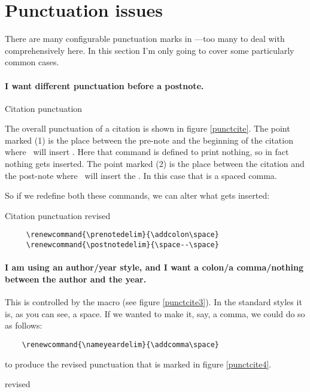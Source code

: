 \section{Punctuation issues}\label{sec:punctuation}

There are many configurable punctuation marks in \biblatex---too many to deal with comprehensively here. In this section I'm only going to cover some particularly common cases.

\paragraph{I want different punctuation before a postnote.}
\begin{marginfigure}[12ex]
\vspace{3pt}%
\caption{Citation punctuation}\label{punctcite}
\end{marginfigure}
 The overall punctuation of a citation is shown in figure \ref{punctcite}. The point marked (1) is the place between the pre-note and the beginning of the citation where \biblatex\ will insert . Here that command is defined to print nothing, so in fact nothing gets inserted. The point marked (2) is the place between the citation and the post-note where \biblatex\ will insert the . In this case that is a spaced comma.

 So if we redefine both these commands, we can alter what gets inserted:\begin{marginfigure}[12ex]
\vspace{3pt}%
\caption{Citation punctuation revised}\label{punctcite2}
\end{marginfigure}
 \begin{Verbatim}
     \renewcommand{\prenotedelim}{\addcolon\space}
     \renewcommand{\postnotedelim}{\space--\space}
 \end{Verbatim}

 \paragraph{I am using an author/year style, and I want a colon/a comma/nothing between the author and the year.} 
\begin{marginfigure}[4ex]
\vspace{3pt}%
\caption{}\label{punctcite3}
\end{marginfigure}
This is controlled by the  macro (see figure \ref{punctcite3}). In the standard styles it is, as you can see, a space. If we wanted to make it, say, a comma, we could do so as follows:
\begin{Verbatim}
    \renewcommand{\nameyeardelim}{\addcomma\space}
\end{Verbatim}
to produce the revised punctuation that is marked in figure \ref{punctcite4}.
\begin{marginfigure}[4ex]
\vspace{3pt}%
\caption{ revised}\label{punctcite4}
\end{marginfigure}


